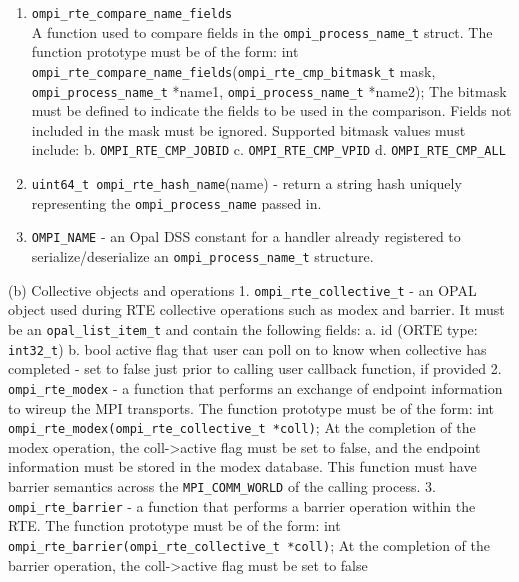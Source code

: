\begin{enumerate}
\item \verb|ompi_rte_compare_name_fields|\\
  A function used to compare fields in the \verb|ompi_process_name_t| struct. The function prototype must be of the form:
        int \verb|ompi_rte_compare_name_fields|(\verb|ompi_rte_cmp_bitmask_t| mask,                                        \verb|ompi_process_name_t| *name1,
                                         \verb|ompi_process_name_t| *name2);
        The bitmask must be defined to indicate the fields to be used
        in the comparison. Fields not included in the mask must be ignored.
        Supported bitmask values must include:
           b. \verb|OMPI_RTE_CMP_JOBID|
           c. \verb|OMPI_RTE_CMP_VPID|
           d. \verb|OMPI_RTE_CMP_ALL|
         \item \verb|uint64_t ompi_rte_hash_name|(name) - return a string hash uniquely representing the \verb|ompi_process_name| passed in.
       \item \verb|OMPI_NAME| - an Opal DSS constant for a handler already registered to serialize/deserialize an \verb|ompi_process_name_t| structure.

\end{enumerate}


\iffalse
         
 (b) Collective objects and operations
     1. \verb|ompi_rte_collective_t| - an OPAL object used during RTE collective operations such as modex and barrier. It must be an \verb|opal_list_item_t| and contain the following fields:
           a. id (ORTE type: \verb|int32_t|)
           b. bool active
              flag that user can poll on to know when collective
              has completed - set to false just prior to
              calling user callback function, if provided
     2. \verb|ompi_rte_modex| - a function that performs an exchange of endpoint information to wireup the MPI transports. The function prototype must be of the form:
        int \verb|ompi_rte_modex(ompi_rte_collective_t *coll)|;
        At the completion of the modex operation, the coll->active flag must be set to false, and the endpoint information must be stored in the modex database.
        This function must have barrier semantics across the \verb|MPI_COMM_WORLD| of the calling process.
     3. \verb|ompi_rte_barrier| - a function that performs a barrier operation within the RTE. The function prototype must be of the form:
        int \verb|ompi_rte_barrier(ompi_rte_collective_t *coll)|;
        At the completion of the barrier operation, the coll->active flag must be set to false

